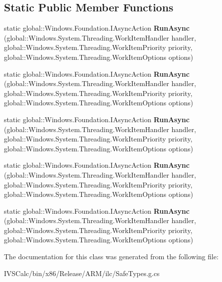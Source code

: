 \subsection*{Static Public Member Functions}
\begin{DoxyCompactItemize}
\item 
\mbox{\label{class_windows_1_1_system_1_1_threading_1_1_thread_pool_a0ef31ae817a7e99fd6ab426dee1eb9e6}} 
static global\+::\+Windows.\+Foundation.\+I\+Async\+Action {\bfseries Run\+Async} (global\+::\+Windows.\+System.\+Threading.\+Work\+Item\+Handler handler, global\+::\+Windows.\+System.\+Threading.\+Work\+Item\+Priority priority, global\+::\+Windows.\+System.\+Threading.\+Work\+Item\+Options options)
\item 
\mbox{\label{class_windows_1_1_system_1_1_threading_1_1_thread_pool_a0ef31ae817a7e99fd6ab426dee1eb9e6}} 
static global\+::\+Windows.\+Foundation.\+I\+Async\+Action {\bfseries Run\+Async} (global\+::\+Windows.\+System.\+Threading.\+Work\+Item\+Handler handler, global\+::\+Windows.\+System.\+Threading.\+Work\+Item\+Priority priority, global\+::\+Windows.\+System.\+Threading.\+Work\+Item\+Options options)
\item 
\mbox{\label{class_windows_1_1_system_1_1_threading_1_1_thread_pool_a0ef31ae817a7e99fd6ab426dee1eb9e6}} 
static global\+::\+Windows.\+Foundation.\+I\+Async\+Action {\bfseries Run\+Async} (global\+::\+Windows.\+System.\+Threading.\+Work\+Item\+Handler handler, global\+::\+Windows.\+System.\+Threading.\+Work\+Item\+Priority priority, global\+::\+Windows.\+System.\+Threading.\+Work\+Item\+Options options)
\item 
\mbox{\label{class_windows_1_1_system_1_1_threading_1_1_thread_pool_a0ef31ae817a7e99fd6ab426dee1eb9e6}} 
static global\+::\+Windows.\+Foundation.\+I\+Async\+Action {\bfseries Run\+Async} (global\+::\+Windows.\+System.\+Threading.\+Work\+Item\+Handler handler, global\+::\+Windows.\+System.\+Threading.\+Work\+Item\+Priority priority, global\+::\+Windows.\+System.\+Threading.\+Work\+Item\+Options options)
\item 
\mbox{\label{class_windows_1_1_system_1_1_threading_1_1_thread_pool_a0ef31ae817a7e99fd6ab426dee1eb9e6}} 
static global\+::\+Windows.\+Foundation.\+I\+Async\+Action {\bfseries Run\+Async} (global\+::\+Windows.\+System.\+Threading.\+Work\+Item\+Handler handler, global\+::\+Windows.\+System.\+Threading.\+Work\+Item\+Priority priority, global\+::\+Windows.\+System.\+Threading.\+Work\+Item\+Options options)
\end{DoxyCompactItemize}


The documentation for this class was generated from the following file\+:\begin{DoxyCompactItemize}
\item 
I\+V\+S\+Calc/bin/x86/\+Release/\+A\+R\+M/ilc/Safe\+Types.\+g.\+cs\end{DoxyCompactItemize}
